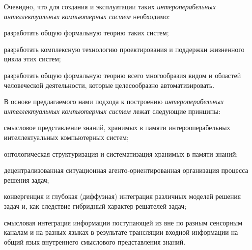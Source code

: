 Очевидно, что для создания и эксплуатации таких \textit{интероперабельных интеллектуальных компьютерных систем} необходимо:

\begin{textitemize}
	\item разработать общую формальную теорию таких систем;
	\item разработать комплексную технологию проектирования и поддержки жизненного цикла этих систем;
	\item разработать общую формальную теорию всего многообразия видом и областей человеческой деятельности, которые целесообразно автоматизировать.
\end{textitemize}

В основе предлагаемого нами подхода к построению \textit{\textit{интероперабельных интеллектуальных компьютерных систем}} лежат следующие принципы:

\begin{textitemize}
	\item смысловое представление знаний, хранимых в памяти интерооперабельных интеллектуальных компьютерных систем;
	\item онтологическая структуризация и систематизация хранимых в памяти знаний;
	\item децентрализованная ситуационная агенто-ориентированная организация процесса решения задач;
	\item конвергенция и глубокая (диффузная) интеграция различных моделей решения задач и, как следствие гибридный характер решателей задач;
	\item смысловая интеграция информации поступающей из вне по разным сенсорным каналам и на разных языках в результате трансляции входной информации на общий язык внутреннего смыслового представления знаний.
\end{textitemize}

\begin{SCn}
	\begin{scnhaselementset}
		\begin{scnindent}
			\begin{scnindent}
			\end{scnindent}
		\end{scnindent} 
	\end{scnhaselementset}\scnheader{}
\end{SCn}

